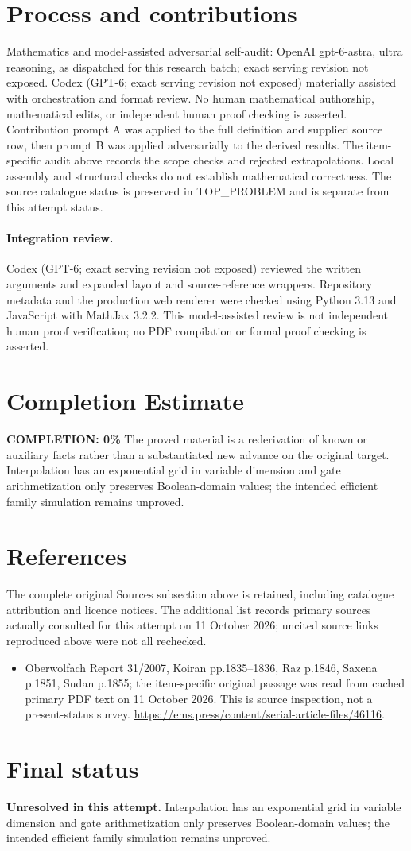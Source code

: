 \documentclass[11pt]{article}
\begin{document}
\section{Process and contributions}
Mathematics and model-assisted adversarial self-audit: OpenAI gpt-6-astra, ultra reasoning, as dispatched for this research batch; exact serving revision not exposed. Codex (GPT-6; exact serving revision not exposed) materially assisted with orchestration and format review. No human mathematical authorship, mathematical edits, or independent human proof checking is asserted.
Contribution prompt A was applied to the full definition and supplied source row, then prompt B was applied adversarially to the derived results. The item-specific audit above records the scope checks and rejected extrapolations. Local assembly and structural checks do not establish mathematical correctness. The source catalogue status is preserved in TOP\_PROBLEM and is separate from this attempt status.
\paragraph{Integration review.} Codex (GPT-6; exact serving revision not exposed) reviewed the written arguments and expanded layout and source-reference wrappers. Repository metadata and the production web renderer were checked using Python 3.13 and JavaScript with MathJax 3.2.2. This model-assisted review is not independent human proof verification; no PDF compilation or formal proof checking is asserted.

\section{Completion Estimate}
\noindent\textbf{COMPLETION: 0\%}
The proved material is a rederivation of known or auxiliary facts rather than a substantiated new advance on the original target. Interpolation has an exponential grid in variable dimension and gate arithmetization only preserves Boolean-domain values; the intended efficient family simulation remains unproved.
\section{References}
The complete original Sources subsection above is retained, including catalogue attribution and licence notices. The additional list records primary sources actually consulted for this attempt on 11 October 2026; uncited source links reproduced above were not all rechecked.
\begin{itemize}
\item Oberwolfach Report 31/2007, Koiran pp.1835--1836, Raz p.1846, Saxena p.1851, Sudan p.1855; the item-specific original passage was read from cached primary PDF text on 11 October 2026. This is source inspection, not a present-status survey. \url{https://ems.press/content/serial-article-files/46116}.
\end{itemize}
\section{Final status}
\textbf{Unresolved in this attempt.} Interpolation has an exponential grid in variable dimension and gate arithmetization only preserves Boolean-domain values; the intended efficient family simulation remains unproved.
\end{document}
